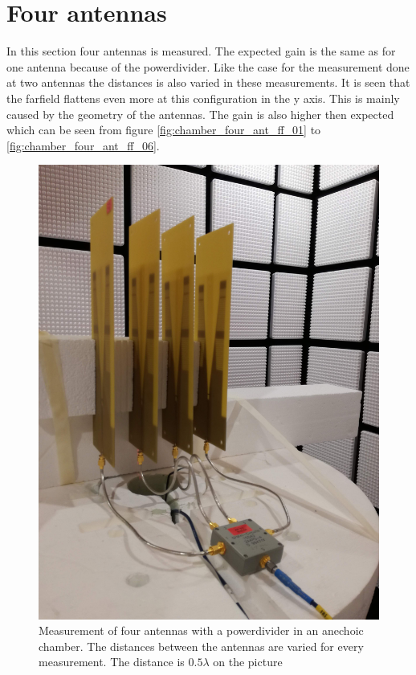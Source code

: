 \section{Four antennas}
In this section four antennas is measured. The expected gain is the same as for one antenna because of the powerdivider. Like the case for the measurement done at two antennas the distances is also varied in these measurements. It is seen that the farfield flattens even more at this configuration in the y axis. This is mainly caused by the geometry of the antennas. The gain is also higher then expected which can be seen from figure \ref{fig:chamber_four_ant_ff_01} to \ref{fig:chamber_four_ant_ff_06}.  

\begin{figure}[H]
\centering 
\includegraphics[scale = 0.05]{figures/measurement/antennas/four_ant.jpg}
\caption{Measurement of four antennas with a powerdivider in an anechoic chamber. The distances between the antennas are varied for every measurement. The distance is $0.5\lambda$ on the picture}
\label{fig:chamber_four_ant}
\end{figure} 


